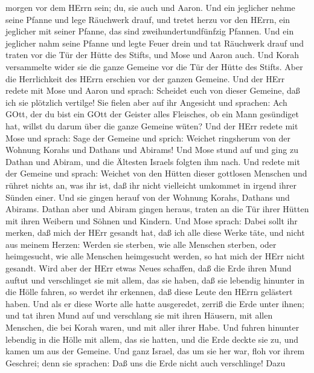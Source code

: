 morgen vor dem HErrn sein; du, sie auch und Aaron.  Und ein
jeglicher nehme seine Pfanne und lege Räuchwerk drauf, und tretet herzu
vor den HErrn, ein jeglicher mit seiner Pfanne, das sind
zweihundertundfünfzig Pfannen.  Und ein jeglicher nahm
seine Pfanne und legte Feuer drein und tat Räuchwerk drauf und traten
vor die Tür der Hütte des Stifts, und Mose und Aaron auch. 
Und Korah versammelte wider sie die ganze Gemeine vor die Tür der Hütte
des Stifts. Aber die Herrlichkeit des HErrn erschien vor der ganzen
Gemeine.  Und der HErr redete mit Mose und Aaron und
sprach:  Scheidet euch von dieser Gemeine, daß ich sie
plötzlich vertilge!  Sie fielen aber auf ihr Angesicht und
sprachen: Ach GOtt, der du bist ein GOtt der Geister alles Fleisches, ob
ein Mann gesündiget hat, willst du darum über die ganze Gemeine wüten?
 Und der HErr redete mit Mose und sprach: 
Sage der Gemeine und sprich: Weichet ringsherum von der Wohnung Korahs
und Dathans und Abirams!  Und Mose stund auf und ging zu
Dathan und Abiram, und die Ältesten Israels folgten ihm nach.
 Und redete mit der Gemeine und sprach: Weichet von den
Hütten dieser gottlosen Menschen und rühret nichts an, was ihr ist, daß
ihr nicht vielleicht umkommet in irgend ihrer Sünden einer.
 Und sie gingen herauf von der Wohnung Korahs, Dathans und
Abirams. Dathan aber und Abiram gingen heraus, traten an die Tür ihrer
Hütten mit ihren Weibern und Söhnen und Kindern.  Und Mose
sprach: Dabei sollt ihr merken, daß mich der HErr gesandt hat, daß ich
alle diese Werke täte, und nicht aus meinem Herzen:  Werden
sie sterben, wie alle Menschen sterben, oder heimgesucht, wie alle
Menschen heimgesucht werden, so hat mich der HErr nicht gesandt.
 Wird aber der HErr etwas Neues schaffen, daß die Erde
ihren Mund auftut und verschlinget sie mit allem, das sie haben, daß sie
lebendig hinunter in die Hölle fahren, so werdet ihr erkennen, daß diese
Leute den HErrn gelästert haben.  Und als er diese Worte
alle hatte ausgeredet, zerriß die Erde unter ihnen;  und
tat ihren Mund auf und verschlang sie mit ihren Häusern, mit allen
Menschen, die bei Korah waren, und mit aller ihrer Habe. 
Und fuhren hinunter lebendig in die Hölle mit allem, das sie hatten, und
die Erde deckte sie zu, und kamen um aus der Gemeine.  Und
ganz Israel, das um sie her war, floh vor ihrem Geschrei; denn sie
sprachen: Daß uns die Erde nicht auch verschlinge!  Dazu
